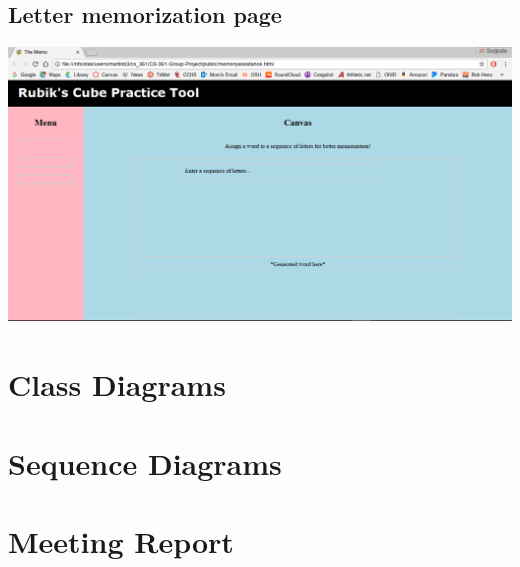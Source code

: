 \documentclass[12pt]{article}
\begin{document}
	\subsection{Letter memorization page}
	\includegraphics[width = \textwidth]{lettermem.PNG}


\section{Class Diagrams}

\section{Sequence Diagrams}

\section{Meeting Report}

\cite{rubtut}



\end{document}
